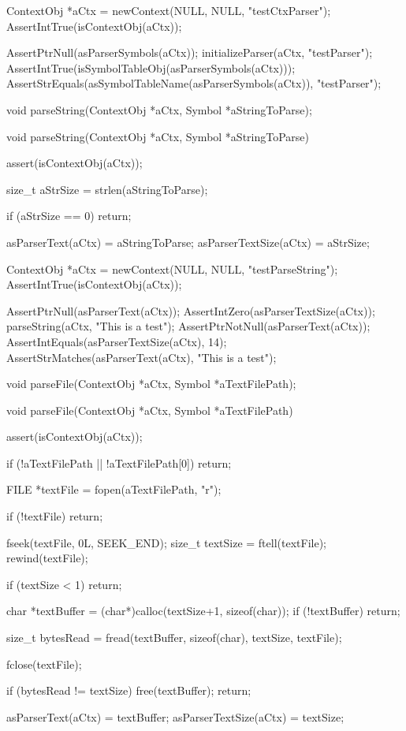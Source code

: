 \startCTest
  ContextObj *aCtx = newContext(NULL, NULL, "testCtxParser");
  AssertIntTrue(isContextObj(aCtx));
  
  AssertPtrNull(asParserSymbols(aCtx));
  initializeParser(aCtx, "testParser");
  AssertIntTrue(isSymbolTableObj(asParserSymbols(aCtx)));
  AssertStrEquals(asSymbolTableName(asParserSymbols(aCtx)), "testParser");
\stopCTest
\stopTestCase
\stopTestSuite


\startTestSuite[parseString]

\startCHeader
void parseString(ContextObj *aCtx, Symbol *aStringToParse);
\stopCHeader

\startCCode
void parseString(ContextObj *aCtx, Symbol *aStringToParse) {
  assert(isContextObj(aCtx));
  
  size_t aStrSize = strlen(aStringToParse);
  
  if (aStrSize == 0) return;
  
  asParserText(aCtx)     = aStringToParse;
  asParserTextSize(aCtx) = aStrSize;
}
\stopCCode


\startCTest
  ContextObj *aCtx = newContext(NULL, NULL, "testParseString");
  AssertIntTrue(isContextObj(aCtx));
  
  AssertPtrNull(asParserText(aCtx));
  AssertIntZero(asParserTextSize(aCtx));
  parseString(aCtx, "This is a test");
  AssertPtrNotNull(asParserText(aCtx));
  AssertIntEquals(asParserTextSize(aCtx), 14);
  AssertStrMatches(asParserText(aCtx), "This is a test");
\stopCTest
\stopTestCase
\stopTestSuite

\startTestSuite[parseFile]

\startCHeader
void parseFile(ContextObj *aCtx, Symbol *aTextFilePath);
\stopCHeader

\startCCode
void parseFile(ContextObj *aCtx, Symbol *aTextFilePath) {
  assert(isContextObj(aCtx));
  
  if (!aTextFilePath || !aTextFilePath[0]) return;
  
  FILE *textFile = fopen(aTextFilePath, "r");
  
  if (!textFile) return;
  
  fseek(textFile, 0L, SEEK_END);
  size_t textSize = ftell(textFile);
  rewind(textFile);
  
  if (textSize < 1) return;
  
  char *textBuffer = (char*)calloc(textSize+1, sizeof(char));
  if (!textBuffer) return;
  
  size_t bytesRead = fread(textBuffer, sizeof(char), textSize, textFile);

  fclose(textFile);
  
  if (bytesRead != textSize) {
    free(textBuffer);
    return;
  }

  asParserText(aCtx)     = textBuffer;
  asParserTextSize(aCtx) = textSize;
}
\stopCCode

